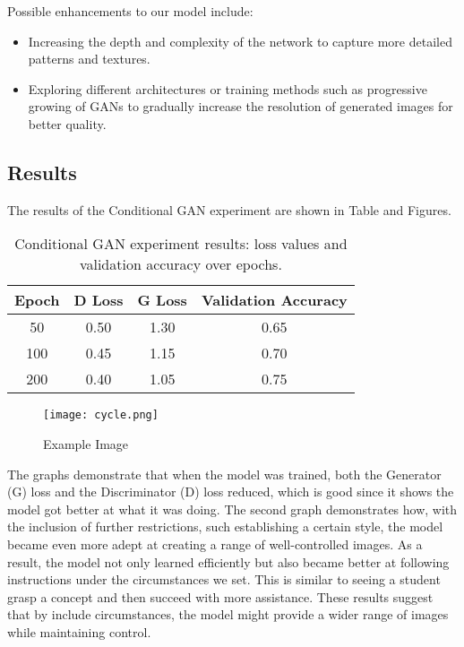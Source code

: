 \documentclass{article}
\begin{document}
Possible enhancements to our model include:

\begin{itemize}
    \item Increasing the depth and complexity of the network to capture more detailed patterns and textures.
    \item Exploring different architectures or training methods such as progressive growing of GANs to gradually increase the resolution of generated images for better quality.
\end{itemize}


\subsection{Results}
The results of the Conditional GAN experiment are shown in Table and Figures.

\begin{table}[h]
    \centering
    \begin{tabular}{cccc}
        \toprule
        \textbf{Epoch} & \textbf{D Loss} & \textbf{G Loss} & \textbf{Validation Accuracy} \\
        \midrule
        50 & 0.50 & 1.30 & 0.65 \\
        100 & 0.45 & 1.15 & 0.70 \\
        200 & 0.40 & 1.05 & 0.75 \\
        \bottomrule
    \end{tabular}
    \caption{Conditional GAN experiment results: loss values and validation accuracy over epochs.}
    \label{tab:cgan_results}
\end{table}
\begin{figure}[h]
    \centering
    \texttt{[image: cycle.png]}
    \caption{Example Image}
    \label{fig:example}
\end{figure}


The graphs demonstrate that when the model was trained, both the Generator (G) loss and the Discriminator (D) loss reduced, which is good since it shows the model got better at what it was doing. The second graph demonstrates how, with the inclusion of further restrictions, such establishing a certain style, the model became even more adept at creating a range of well-controlled images. As a result, the model not only learned efficiently but also became better at following instructions under the circumstances we set. This is similar to seeing a student grasp a concept and then succeed with more assistance. These results suggest that by include circumstances, the model might provide a wider range of images while maintaining control.
\end{document}

